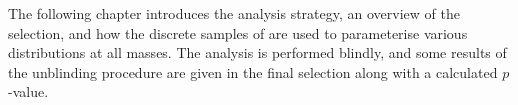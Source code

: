 The following chapter introduces the analysis strategy, an overview of the selection, and how the
discrete samples of \btokstrdb are used to parameterise various distributions at all masses.
The analysis is performed blindly, and some results of the unblinding procedure are given in the final
selection along with a calculated $p$-value.











